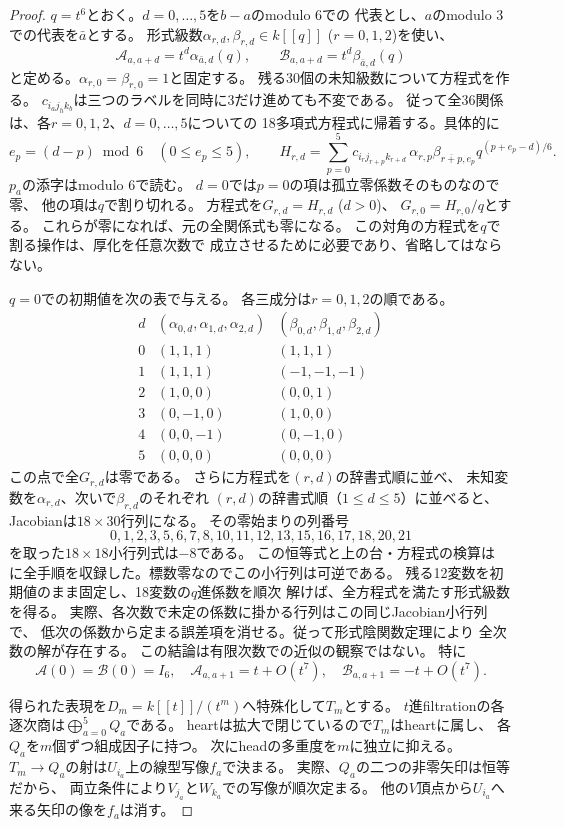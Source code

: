 \begin{proof}
$q=t^6$とおく。$d=0,\ldots,5$を$b-a$のmodulo 6での
代表とし、$a$のmodulo 3での代表を$\bar a$とする。
形式級数$\alpha_{r,d},\beta_{r,d}\in k[[q]]$ ($r=0,1,2$)を使い、
\[
 \mathcal A_{a,a+d}=t^d\alpha_{\bar a,d}(q),\qquad
 \mathcal B_{a,a+d}=t^d\beta_{\bar a,d}(q)
\]
と定める。$\alpha_{r,0}=\beta_{r,0}=1$と固定する。
残る30個の未知級数について方程式を作る。
$c_{i_a j_h k_b}$は三つのラベルを同時に3だけ進めても不変である。
従って全36関係は、各$r=0,1,2$、$d=0,\ldots,5$についての
18多項式方程式に帰着する。具体的に
\[
 e_p=(d-p)\bmod 6\quad(0\leq e_p\leq5),\qquad
 H_{r,d}=
 \sum_{p=0}^5 c_{i_r j_{r+p} k_{r+d}}\,
 \alpha_{r,p}\beta_{\overline{r+p},e_p}
 q^{(p+e_p-d)/6}.
\]
$p_a$の添字はmodulo 6で読む。
$d=0$では$p=0$の項は孤立零係数そのものなので零、
他の項は$q$で割り切れる。
方程式を$G_{r,d}=H_{r,d}$ ($d>0$)、
$G_{r,0}=H_{r,0}/q$とする。
これらが零になれば、元の全関係式も零になる。
この対角の方程式を$q$で割る操作は、厚化を任意次数で
成立させるために必要であり、省略してはならない。

$q=0$での初期値を次の表で与える。
各三成分は$r=0,1,2$の順である。
\[
\begin{array}{c|c|c}
d&(\alpha_{0,d},\alpha_{1,d},\alpha_{2,d})
 &(\beta_{0,d},\beta_{1,d},\beta_{2,d})\\ \hline
0&(1,1,1)&(1,1,1)\\
1&(1,1,1)&(-1,-1,-1)\\
2&(1,0,0)&(0,0,1)\\
3&(0,-1,0)&(1,0,0)\\
4&(0,0,-1)&(0,-1,0)\\
5&(0,0,0)&(0,0,0)
\end{array}
\]
この点で全$G_{r,d}$は零である。
さらに方程式を$(r,d)$の辞書式順に並べ、
未知変数を$\alpha_{r,d}$、次いで$\beta_{r,d}$のそれぞれ
$(r,d)$の辞書式順（$1\leq d\leq5$）に並べると、
Jacobianは$18\times30$行列になる。
その零始まりの列番号
\[
 0,1,2,3,5,6,7,8,10,11,12,13,15,16,17,18,20,21
\]
を取った$18\times18$小行列式は$-8$である。
この恒等式と上の台・方程式の検算は
に全手順を収録した。標数零なのでこの小行列は可逆である。
残る12変数を初期値のまま固定し、18変数の$q$進係数を順次
解けば、全方程式を満たす形式級数を得る。
実際、各次数で未定の係数に掛かる行列はこの同じJacobian小行列で、
低次の係数から定まる誤差項を消せる。従って形式陰関数定理により
全次数の解が存在する。
この結論は有限次数での近似の観察ではない。
特に
\[
 \mathcal A(0)=\mathcal B(0)=I_6,\quad
 \mathcal A_{a,a+1}=t+O(t^7),\quad
 \mathcal B_{a,a+1}=-t+O(t^7).
\]

得られた表現を$D_m=k[[t]]/(t^m)$へ特殊化して$T_m$とする。
$t$進filtrationの各逐次商は$\bigoplus_{a=0}^5Q_a$である。
heartは拡大で閉じているので$T_m$はheartに属し、
各$Q_a$を$m$個ずつ組成因子に持つ。
次にheadの多重度を$m$に独立に抑える。
$T_m\to Q_a$の射は$U_{i_a}$上の線型写像$f_a$で決まる。
実際、$Q_a$の二つの非零矢印は恒等だから、
両立条件により$V_{j_a}$と$W_{k_a}$での写像が順次定まる。
他の$V$頂点から$U_{i_a}$へ来る矢印の像を$f_a$は消す。


\end{proof}
